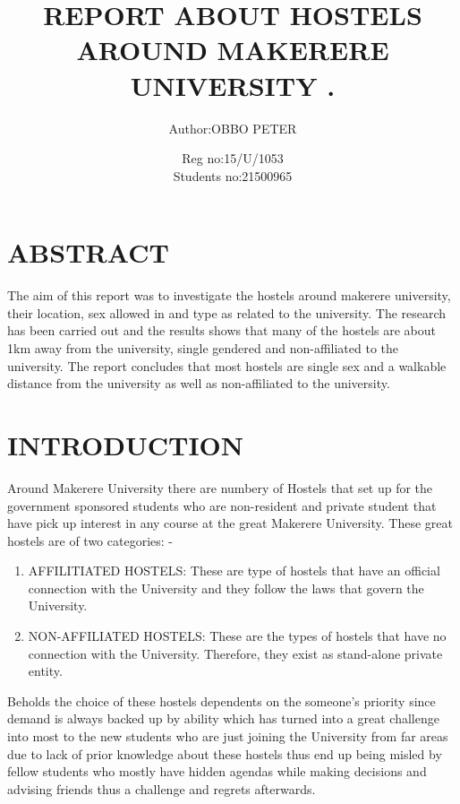 \documentclass{article}
\begin{document}
\title{REPORT ABOUT HOSTELS AROUND MAKERERE UNIVERSITY .}

\author{Author:OBBO PETER}
	\date{Reg no:15/U/1053 \\  Students no:21500965}


\maketitle


\tableofcontents

\section{ABSTRACT}\label{sec:into}

The aim of this report was to investigate the hostels around makerere university, their location, sex allowed in and type as related to the university. The research has been carried out and the results shows that many of the hostels are about 1km away from the university, single gendered and non-affiliated to the university. The report concludes that most hostels are single sex and a walkable distance from the university as well as non-affiliated to the university.



\section{INTRODUCTION}\label{sec:into}
Around Makerere University there are numbery of Hostels that set up for the government sponsored students who are non-resident and private student that have pick up interest in any course at the great Makerere University.
	These great hostels are of two categories: -
	\begin{enumerate}
	\item  AFFILITIATED HOSTELS: These are type of hostels that have an official connection with the University and they follow the laws that govern the University.
	\item NON-AFFILIATED HOSTELS: These are the types of hostels that have no connection with the University. Therefore, they exist as stand-alone private entity.
\end{enumerate}

Beholds the choice of these hostels dependents on the someone’s priority since demand is always backed up by ability which has turned into a great challenge into most to the new students who are just joining the University from far areas due to lack of prior knowledge about these hostels thus end up being misled by fellow students who mostly have hidden agendas while making decisions and advising friends thus a challenge and regrets afterwards. 
\end{document}

